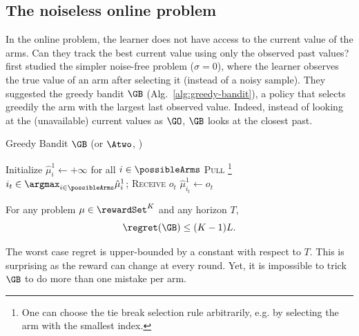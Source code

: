 \subsection{The noiseless online problem \citep{heidari2016tight}}
\label{ss:rested-noiseless-online}
In the online problem, the learner does not have access to the current value of the arms. Can they track the best current value using only the observed past values?  \citet{heidari2016tight} first studied the simpler noise-free problem ($\sigma =0$), where the learner observes the true value of an arm after selecting it (instead of a noisy sample). They suggested the greedy bandit $\GB$ (Alg.~\ref{alg:greedy-bandit}), a policy that selects greedily the arm with the largest last observed value. Indeed, instead of looking at the (unavailable) current values as $\GO$, $\GB$ looks at the closest past. 

\begin{minipage}{\textwidth}
\renewcommand*\footnoterule{}
\begin{savenotes}
\begin{algorithm}[H]
\caption{Greedy Bandit $\GB$ (or $\Atwo$, \citet{heidari2016tight})}
\label{alg:greedy-bandit}
\begin{algorithmic}[1]
\Require
\State Initialize $\hat{\mu}_{i}^1 \leftarrow + \infty$ for all $i \in \possibleArms$
		\State \textsc{Pull} \footnote{One can choose the tie break selection rule arbitrarily, e.g. by selecting the arm with the smallest index.} $i_t \in \argmax_{i \in \possibleArms} \hat{\mu}_{i}^1$; \textsc{Receive} $o_{t}$
		\State $\hat{\mu}_{i_t}^1 \leftarrow o_{t}$
	\EndFor
\end{algorithmic}
\end{algorithm}
\end{savenotes}
\end{minipage}


\begin{proposition}
\label{prop:GB-ub}
For any problem $\mu \in \rewardSet^K$ and any horizon $T$, 
\[\regret (\GB) \leq (K-1)L. \]
\end{proposition}
The worst case regret is upper-bounded by a constant with respect to $T$. This is surprising as the reward can change at every round. Yet, it is impossible to trick $\GB$ to do more than one mistake per arm. 

